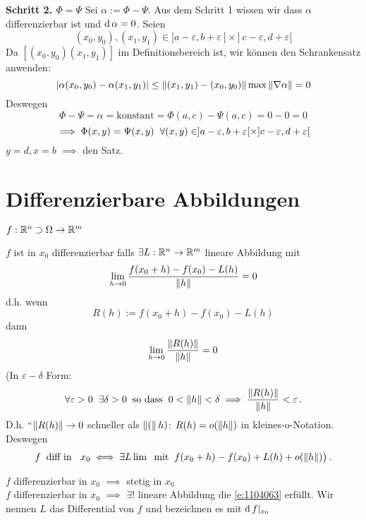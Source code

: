 \begin{Bew}
\medskip

{\bf Schritt 2. $\Phi=\Psi$} Sei $\alpha:=\Phi-\Psi$. Aus dem Schritt 1 wissen wir dass $\alpha$ differenzierbar ist
und $\operatorname{d} \alpha=0$. Seien
  \[(x_0, y_0), (x_1, y_1)\in [a-\varepsilon, b+\varepsilon[\times ]c-\varepsilon,d+\varepsilon [\]
  Da $[(x_0,y_0)(x_1,y_1)]$ im Definitionsbereich ist, wir k\"onnen den Schrankensatz anwenden:
\[\left| \alpha(x_0,y_0)-\alpha(x_1,y_1) \right|\leq\left\| (x_1,y_1)-(x_0,y_0) \right\|\max\left\| \nabla\alpha \right\|=0\]
  Deswegen
  \[\Phi-\Psi=\alpha=\text{konstant}=\Phi(a,c)-\Psi(a,c)=0-0=0\]
  \[\implies \Phi(x,y)=\Psi(x,y) \hspace{2mm}\forall (x,y)\in ]a-\varepsilon,b+\varepsilon [\times ]c-\varepsilon, d+\varepsilon [\]
  $y=d,x=b$ $\implies$ den Satz.
\end{Bew}
\section{Differenzierbare Abbildungen}
$f:\mathbb{R}^n\supset \Omega\rightarrow\mathbb{R}^m$
\begin{Def}
  $f$ ist in $x_0$ differenzierbar falls $\exists L:\mathbb{R}^n\rightarrow\mathbb{R}^m$ lineare Abbildung mit
  \[\displaystyle\lim_{h\rightarrow0}\frac{f(x_0+h)-f(x_0)-L(h)}{\left\| h \right\|}=0\]
  d.h. wenn 
  \[R(h):=f(x_0+h)-f(x_0)-L(h)\]
  dann
  \[\displaystyle\lim_{h\rightarrow0}\frac{\left\| R(h) \right\|}{\left\| h \right\|}=0\]
(In $\varepsilon-\delta$ Form:
\[\forall \varepsilon>0\hspace{2mm}\exists\delta>0\hspace{2mm}\text{so dass}\hspace{2mm}0<\left\| h \right\|<\delta\implies \frac{\left\| R(h) \right\|}{\left\| h \right\|}<\varepsilon\, .\]
  D.h. ``$\left\| R(h) \right\|\rightarrow 0$ schneller als $\left\| ( \right\|h)$: $R(h)=o(\left\| h \right\|)$ in kleines-o-Notation. Deswegen
  \begin{equation}
    \label{e:1104063}
    f\hspace{2mm}\text{diff in }\hspace{2mm} x_0\iff \exists L \lim\hspace{2mm}\text{mit}\hspace{2mm} f(x_0+h)-f(x_0)+L(h)+o(\left\| h \right\|) \big)\, .
  \end{equation}
\end{Def}
\begin{Bem}
  $f$ differenzierbar in $x_0$ $\implies$ stetig in $x_0$\\
  $f$ differenzierbar in $x_0$ $\implies$ $\exists !$ lineare Abbildung die \eqref{e:1104063} erfüllt. Wir nennen $L$ das Differential von $f$ und bezeichnen es mit $\operatorname{d} f|_{x_0}$
\end{Bem}

